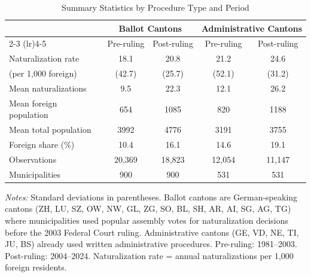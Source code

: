 \begin{table}[htbp]
\centering
\caption{Summary Statistics by Procedure Type and Period}
\label{tab:summary}
\begin{threeparttable}
\begin{tabular}{lcccc}
\toprule
& \multicolumn{2}{c}{Ballot Cantons} & \multicolumn{2}{c}{Administrative Cantons} \\
\cmidrule(lr){2-3} \cmidrule(lr){4-5}
& Pre-ruling & Post-ruling & Pre-ruling & Post-ruling \\
\midrule
Naturalization rate & 18.1 & 20.8 & 21.2 & 24.6 \\
\quad (per 1,000 foreign) & (42.7) & (25.7) & (52.1) & (31.2) \\
Mean naturalizations & 9.5 & 22.3 & 12.1 & 26.2 \\
Mean foreign population & 654 & 1085 & 820 & 1188 \\
Mean total population & 3992 & 4776 & 3191 & 3755 \\
Foreign share (\%) & 10.4 & 16.1 & 14.6 & 19.1 \\
Observations & 20,369 & 18,823 & 12,054 & 11,147 \\
Municipalities & 900 & 900 & 531 & 531 \\
\bottomrule
\end{tabular}
\begin{tablenotes}
\item \textit{Notes:} Standard deviations in parentheses. Ballot cantons are German-speaking cantons (ZH, LU, SZ, OW, NW, GL, ZG, SO, BL, SH, AR, AI, SG, AG, TG) where municipalities used popular assembly votes for naturalization decisions before the 2003 Federal Court ruling. Administrative cantons (GE, VD, NE, TI, JU, BS) already used written administrative procedures. Pre-ruling: 1981--2003. Post-ruling: 2004--2024. Naturalization rate = annual naturalizations per 1,000 foreign residents.
\end{tablenotes}
\end{threeparttable}
\end{table}


